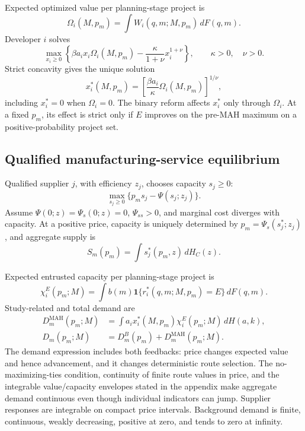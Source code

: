 \documentclass[11pt]{article}
\begin{document}
Expected optimized value per planning-stage project is
\begin{equation}
  \Omega_i(M,p_m)
  =
  \int W_i(q,m;M,p_m)\,dF(q,m).
  \label{eq:p16m-omega}
\end{equation}
Developer \(i\) solves
\begin{equation}
  \max_{x_i\geq0}
  \left\{
  \beta a_ix_i\Omega_i(M,p_m)
  -
  \frac{\kappa}{1+\nu}x_i^{1+\nu}
  \right\},
  \qquad \kappa>0,\quad \nu>0.
  \label{eq:p16m-advancement-problem}
\end{equation}
Strict concavity gives the unique solution
\begin{equation}
  x_i^*(M,p_m)
  =
  \left[
  \frac{\beta a_i}{\kappa}\Omega_i(M,p_m)
  \right]^{1/\nu},
  \label{eq:p16m-advancement}
\end{equation}
including \(x_i^*=0\) when \(\Omega_i=0\). The binary reform affects
\(x_i^*\) only through \(\Omega_i\). At a fixed \(p_m\), its effect is
strict only if \(E\) improves on the pre-MAH maximum on a
positive-probability project set.

\subsection{Qualified manufacturing-service equilibrium}
\label{subsec:p16m-cmo}

Qualified supplier \(j\), with efficiency \(z_j\), chooses capacity
\(s_j\geq0\):
\begin{equation}
  \max_{s_j\geq0}\{p_ms_j-\Psi(s_j;z_j)\}.
  \label{eq:p16m-supplier}
\end{equation}
Assume \(\Psi(0;z)=\Psi_s(0;z)=0\),
\(\Psi_{ss}>0\), and marginal cost diverges with capacity. At a positive
price, capacity is uniquely determined by
\(p_m=\Psi_s(s_j^*;z_j)\), and aggregate supply is
\[
  S_m(p_m)=\int s_j^*(p_m,z)\,dH_C(z).
\]

Expected entrusted capacity per planning-stage project is
\begin{equation}
  \chi_i^E(p_m;M)
  =
  \int b(m)\mathbf 1\{r_i^*(q,m;M,p_m)=E\}\,dF(q,m).
  \label{eq:p16m-project-demand}
\end{equation}
Study-related and total demand are
\begin{equation}
  \begin{aligned}
  D_m^{\mathrm{MAH}}(p_m;M)
  &=
  \int a_ix_i^*(M,p_m)\chi_i^E(p_m;M)\,dH(a,k),\\
  D_m(p_m;M)
  &=D_m^B(p_m)+D_m^{\mathrm{MAH}}(p_m;M).
  \end{aligned}
  \label{eq:p16m-demand}
\end{equation}
The demand expression includes both feedbacks: price changes expected value
and hence advancement, and it changes deterministic route selection.
The no-maximizing-ties condition, continuity of finite route values in price,
and the integrable value/capacity envelopes stated in the appendix make
aggregate demand continuous even though individual indicators can jump.
Supplier responses are integrable on compact price intervals. Background
demand is finite, continuous, weakly decreasing, positive at zero, and tends
to zero at infinity.
\end{document}
